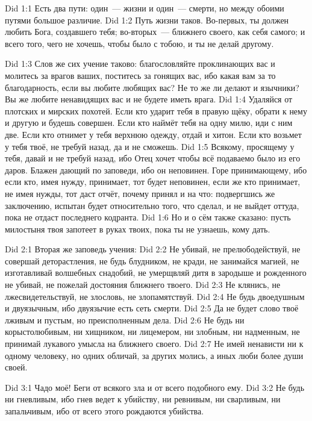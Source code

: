 \vs Did 1:1
Есть два пути: один~--- жизни и один~--- смерти,
но между обоими путями большое различие.
\vs Did 1:2
Путь жизни таков.
Во-первых, ты должен любить Бога, создавшего тебя;
во-вторых~--- ближнего своего, как себя самого;
и всего того, чего не хочешь, чтобы было с тобою,
и ты не делай другому.

\vs Did 1:3
Слов же сих учение таково: благословляйте проклинающих вас и
молитесь за врагов ваших, поститесь за гонящих вас, ибо какая
вам за то благодарность, если вы любите любящих вас?
Не то же ли делают и язычники?
Вы же любите ненавидящих вас и не будете иметь врага.
\vs Did 1:4
Удаляйся от плотских и мирских похотей.
Если кто ударит тебя в правую щёку, обрати к нему и другую и будешь совершен.
Если кто наймёт тебя на одну милю, иди с ним две.
Если кто отнимет у тебя верхнюю одежду, отдай и хитон.
Если кто возьмет у тебя твоё, не требуй назад, да и не сможешь.
\vs Did 1:5
Всякому, просящему у тебя, давай и не требуй назад, ибо Отец
хочет чтобы всё подаваемо было из его даров.
Блажен дающий по заповеди, ибо он неповинен.
Горе принимающему, ибо если кто, имея нужду,
принимает, тот будет неповинен, если же кто принимает,
не имея нужды, тот даст отчёт, почему принял и на что:
подвергшись же заключению, испытан будет относительно того,
что сделал, и не выйдет оттуда, пока не отдаст последнего кодранта.
\vs Did 1:6
Но и о сём также сказано: пусть милостыня твоя запотеет
в руках твоих, пока ты не узнаешь, кому дать.

\vs Did 2:1
Вторая же заповедь учения:
\vs Did 2:2
Не убивай,
не прелюбодействуй,
не совершай деторастления,
не будь блудником,
не кради,
не занимайся магией,
не изготавливай волшебных снадобий,
не умерщвляй дитя в зародыше и рожденного не убивай,
не пожелай достояния ближнего твоего.
\vs Did 2:3
Не клянись,
не лжесвидетельствуй,
не злословь,
не злопамятствуй.
\vs Did 2:4
Не будь двоедушным и двуязычным,
ибо двуязычие есть сеть смерти.
\vs Did 2:5
Да не будет слово твоё лживым и пустым, но преисполненным дела.
\vs Did 2:6
Не будь
ни корыстолюбивым,
ни хищником,
ни лицемером,
ни злобным,
ни надменным,
не принимай лукавого умысла на ближнего своего.
\vs Did 2:7
Не имей ненависти ни к одному человеку, но одних обличай, за
других молись, а иных люби более души своей.

\vs Did 3:1
Чадо моё!
Беги от всякого зла и от
всего
подобного ему.
\vs Did 3:2
Не будь
ни гневливым, ибо гнев ведет к убийству,
ни ревнивым,
ни сварливым,
ни запальчивым, ибо от всего этого рождаются убийства.

